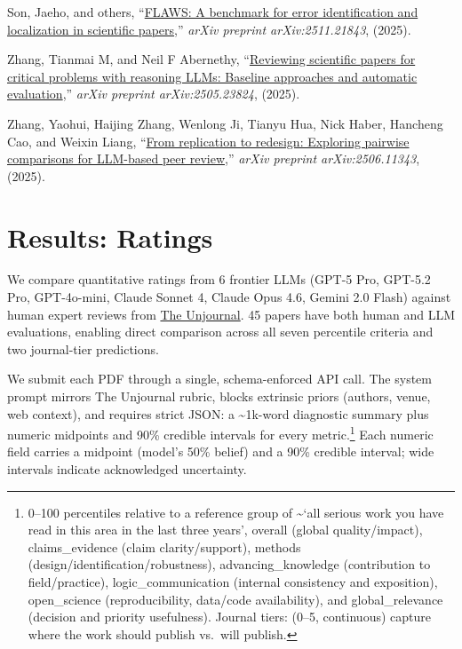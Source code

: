 \documentclass[
  11pt,
  letterpaper,
]{article}
\newlength{\cslhangindent}
\newenvironment{CSLReferences}[2] %
 {\begin{list}{}{%
  \setlength{\itemindent}{0pt}
  \setlength{\leftmargin}{0pt}
  \setlength{\parsep}{0pt}
  \ifodd #1
   \setlength{\leftmargin}{\cslhangindent}
   \setlength{\itemindent}{-1\cslhangindent}
  \fi
  \setlength{\itemsep}{#2\baselineskip}}}
 {\end{list}}
\begin{document}
\begin{CSLReferences}{1}{0}
Son, Jaeho, and others,
{``\href{https://arxiv.org/abs/2511.21843}{FLAWS: A benchmark for error
identification and localization in scientific papers},''} \emph{arXiv
preprint arXiv:2511.21843}, (2025).

Zhang, Tianmai M, and Neil F Abernethy,
{``\href{https://arxiv.org/abs/2505.23824v2}{Reviewing scientific papers
for critical problems with reasoning LLMs: Baseline approaches and
automatic evaluation},''} \emph{arXiv preprint arXiv:2505.23824},
(2025).

Zhang, Yaohui, Haijing Zhang, Wenlong Ji, Tianyu Hua, Nick Haber,
Hancheng Cao, and Weixin Liang,
{``\href{https://arxiv.org/abs/2506.11343v1}{From replication to
redesign: Exploring pairwise comparisons for LLM-based peer review},''}
\emph{arXiv preprint arXiv:2506.11343}, (2025).

\end{CSLReferences}

\cleardoublepage
{}
{}
\appendix

\section{Results: Ratings}\label{results-ratings}

We compare quantitative ratings from 6 frontier LLMs (GPT-5 Pro, GPT-5.2
Pro, GPT-4o-mini, Claude Sonnet 4, Claude Opus 4.6, Gemini 2.0 Flash)
against human expert reviews from
\href{https://unjournal.pubpub.org}{The Unjournal}. 45 papers have both
human and LLM evaluations, enabling direct comparison across all seven
percentile criteria and two journal-tier predictions.

We submit each PDF through a single, schema-enforced API call. The
system prompt mirrors The Unjournal rubric, blocks extrinsic priors
(authors, venue, web context), and requires strict JSON: a
\textasciitilde1k-word diagnostic summary plus numeric midpoints and
90\% credible intervals for every metric.\footnote{0--100 percentiles
  relative to a reference group of \textasciitilde{}`all serious work
  you have read in this area in the last three years', overall (global
  quality/impact), claims\_evidence (claim clarity/support), methods
  (design/identification/robustness), advancing\_knowledge (contribution
  to field/practice), logic\_communication (internal consistency and
  exposition), open\_science (reproducibility, data/code availability),
  and global\_relevance (decision and priority usefulness). Journal
  tiers: (0--5, continuous) capture where the work should publish
  vs.~will publish.} Each numeric field carries a midpoint (model's 50\%
belief) and a 90\% credible interval; wide intervals indicate
acknowledged uncertainty.
\end{document}
